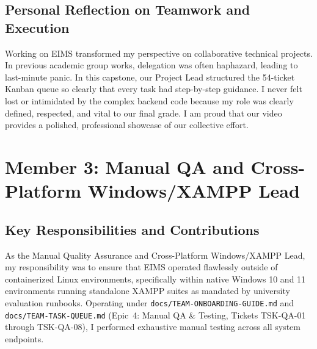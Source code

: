 \subsection{Personal Reflection on Teamwork and Execution}
Working on EIMS transformed my perspective on collaborative technical projects. In previous academic group works, delegation was often haphazard, leading to last-minute panic. In this capstone, our Project Lead structured the 54-ticket Kanban queue so clearly that every task had step-by-step guidance. I never felt lost or intimidated by the complex backend code because my role was clearly defined, respected, and vital to our final grade. I am proud that our video provides a polished, professional showcase of our collective effort.

\newpage
\section{Member 3: Manual QA and Cross-Platform Windows/XAMPP Lead}
\label{sec:reflection_member_3}

\subsection{Key Responsibilities and Contributions}
As the Manual Quality Assurance and Cross-Platform Windows/XAMPP Lead, my responsibility was to ensure that EIMS operated flawlessly outside of containerized Linux environments, specifically within native Windows 10 and 11 environments running standalone XAMPP suites as mandated by university evaluation runbooks. Operating under \texttt{docs/TEAM-ONBOARDING-GUIDE.md} and \texttt{docs/TEAM-TASK-QUEUE.md} (Epic~4: Manual QA \& Testing, Tickets TSK-QA-01 through TSK-QA-08), I performed exhaustive manual testing across all system endpoints.

